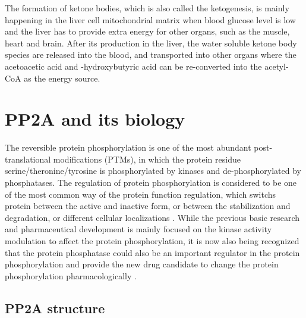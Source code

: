The formation of ketone bodies, which is also called the ketogenesis, is mainly happening in the liver cell mitochondrial matrix when blood glucose level is low and the liver has to provide extra energy for other organs, such as the muscle, heart and brain. After its production in the liver, the water soluble ketone body species are released into the blood, and transported into other organs where the acetoacetic acid and \textbeta{}-hydroxybutyric acid can be re-converted into the acetyl-CoA as the energy source. 


\section{PP2A and its biology}

The reversible protein phosphorylation is one of the most abundant post-translational modifications (PTMs), in which the protein residue serine/theronine/tyrosine is phosphorylated by kinases and de-phosphorylated by phosphatases. The regulation of protein phosphorylation is considered to be one of the most common way of the protein function regulation, which switchs protein between the active and inactive form, or between the stabilization and degradation, or different cellular localizations \cite{ptacek_charging_2006,pawson_protein_2005,cohen_regulation_2000}. While the previous basic research and pharmaceutical development is mainly focused on the kinase activity modulation to affect the protein phosphorylation, it is now also being recognized that the protein phosphatase could also be an important regulator in the protein phosphorylation and provide the new drug candidate to change the protein phosphorylation pharmacologically \cite{newton_turning_2014,khanna_cancerous_2013,chatterjee_targeting_2013,de_munter_challenges_2013,dadke_protein-tyrosine_2003}. 

\subsection{PP2A structure}

